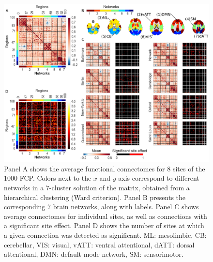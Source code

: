 \documentclass[authoryear]{elsarticle}
\begin{document}
\begin{figure}[htbp]
\begin{center}
\includegraphics[width=\linewidth]{../figures/connectome_multisite.png}
\end{center}
\caption[Connectome variability across sites]{
Panel A shows the average functional connectomes for 8 sites of the 1000 FCP. Colors next to the $x$ and $y$ axis correspond to different networks in a 7-cluster solution of the matrix, obtained from a hierarchical clustering (Ward criterion). Panel B presents the corresponding 7 brain networks, along with labels. Panel C shows average connectomes for individual sites, as well as connections with a significant site effect. Panel D shows the number of sites at which a given connection was detected as significant. ML: mesolimbic, CB: cerebellar, VIS: visual, vATT: ventral attentional, dATT: dorsal attentional, DMN: default mode network, SM: sensorimotor.
}
\label{fig_connectome_variability}
\end{figure}
\end{document}

